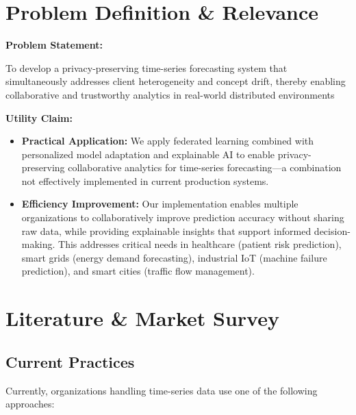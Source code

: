 \documentclass[11pt, a4paper]{article}
\begin{document}

\section{Problem Definition \& Relevance}

\textbf{Problem Statement:} 

To develop a privacy-preserving time-series forecasting system that simultaneously addresses client heterogeneity and concept drift, thereby enabling collaborative and trustworthy analytics in real-world distributed environments

\vspace{0.2cm}
\textbf{Utility Claim:}

\begin{itemize}[noitemsep, topsep=0pt]
    \item \textbf{Practical Application:} We apply federated learning combined with personalized model adaptation and explainable AI to enable privacy-preserving collaborative analytics for time-series forecasting—a combination not effectively implemented in current production systems.
    
    \item \textbf{Efficiency Improvement:} Our implementation enables multiple organizations to collaboratively improve prediction accuracy without sharing raw data, while providing explainable insights that support informed decision-making. This addresses critical needs in healthcare (patient risk prediction), smart grids (energy demand forecasting), industrial IoT (machine failure prediction), and smart cities (traffic flow management).
\end{itemize}

\section{Literature \& Market Survey}

\subsection{Current Practices}

Currently, organizations handling time-series data use one of the following approaches:
\end{document}
